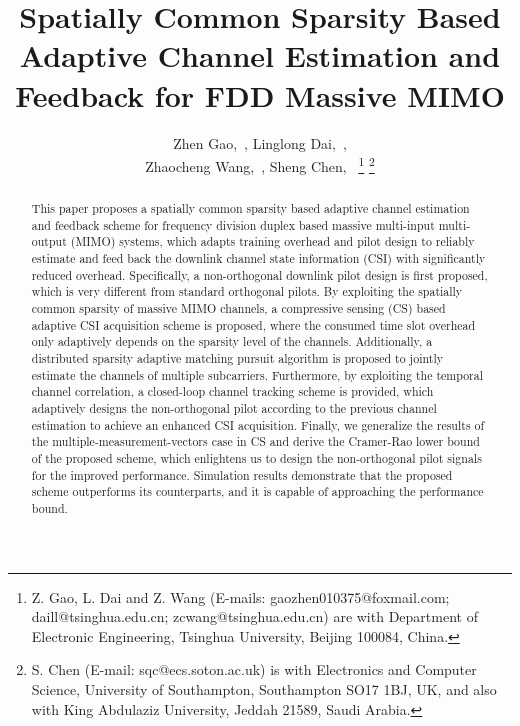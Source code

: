 \documentclass[final]{IEEEtran}
\begin{document}
\newtheorem{lemma}{Lemma}
\newtheorem{corol}{Corollary}
\newtheorem{theorem}{Theorem}
\newtheorem{proposition}{Proposition}
\newtheorem{problem}{Problem}
\newtheorem{definition}{Definition}
\newcommand{\e}{\begin{equation}}
\newcommand{\ee}{\end{equation}}
\newcommand{\eqn}{\begin{eqnarray}}
\newcommand{\eeqn}{\end{eqnarray}}
\title{ Spatially Common Sparsity Based Adaptive Channel Estimation and Feedback for FDD Massive MIMO}
\author{Zhen Gao,~, Linglong Dai,~,\\
 Zhaocheng Wang,~,
 Sheng Chen,~%
\thanks{Z. Gao, L. Dai and Z. Wang (E-mails: gaozhen010375@foxmail.com;
 daill@tsinghua.edu.cn; zcwang@tsinghua.edu.cn) are with Department of Electronic
 Engineering, Tsinghua University, Beijing 100084, China.} %
\thanks{S. Chen (E-mail: sqc@ecs.soton.ac.uk) is with Electronics and Computer Science,
 University of Southampton, Southampton SO17 1BJ, UK, and also with King
 Abdulaziz University, Jeddah 21589, Saudi Arabia.} %
}

\maketitle

\begin{abstract}
 This paper proposes a spatially common sparsity based adaptive channel estimation
 and feedback scheme for frequency division duplex based massive multi-input multi-output
 (MIMO) systems, which adapts training overhead and pilot design to reliably estimate and
 feed back the downlink channel state information (CSI) with significantly reduced overhead.
 Specifically, a non-orthogonal downlink pilot design is first proposed, which is very
 different from standard orthogonal pilots. By exploiting the spatially common sparsity
 of massive MIMO channels, a compressive sensing (CS) based adaptive CSI acquisition
 scheme is proposed, where the consumed time slot overhead only adaptively depends on the
 sparsity level of the channels. Additionally, a distributed sparsity adaptive matching
 pursuit algorithm is proposed to jointly estimate the channels of multiple subcarriers.
 Furthermore, by exploiting the temporal channel correlation, a closed-loop channel
 tracking scheme is provided, which adaptively designs the non-orthogonal pilot according
 to the previous channel estimation to achieve an enhanced CSI acquisition. Finally,
 we generalize the results of the multiple-measurement-vectors case in CS and derive the
 Cramer-Rao lower bound of the proposed scheme, which enlightens us to design the
 non-orthogonal pilot signals for the improved performance. Simulation results demonstrate
 that the proposed scheme outperforms its counterparts, and it is capable of approaching
 the performance bound.
\end{abstract}
\end{document}
